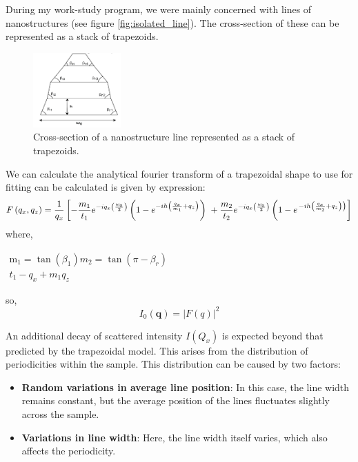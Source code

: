 \medskip

During my work-study program, we were mainly concerned with lines of nanostructures (see figure \ref{fig:isolated_line}). The cross-section of
these can be represented as a stack of trapezoids.
\begin{figure}[h]
    \centering
    \includegraphics[width=0.3\textwidth]{images/trapezoid.png}
    \caption{Cross-section of a nanostructure line represented as a stack of trapezoids.}
    
\end{figure}
We can calculate the analytical fourier transform of a trapezoidal shape to use for fitting
can be calculated is given by expression:
\begin{equation}
    F\left(q_{x}, q_{z}\right)=\frac{1}{q_{x}}\left[-\frac{m_{1}}{t_{1}} e^{-i q_{x}\left(\frac{\omega_{0}}{2}\right)}\left(1-e^{-i h\left(\frac{q_{x}}{m_{1}}+q_{z}\right)}\right)\right. \\ +\frac{m_{2}}{t_{2}} e^{-i q_{x}\left(\frac{\omega_{0}}{2}\right)}\left(1-e^{\left.-i h\left(\frac{q_{x}}{m_{2}}+q_{z}\right)\right)}\right]
\end{equation}
where,

\( \begin{array}{l}\mathrm{m}_{1}=\tan \left(\beta_{1}\right) m_{2}=\tan \left(\pi-\beta_{r}\right) \\ t_{1}-q_{x}+m_{1} q_{z}\end{array} \)

\medskip

so,
\begin{equation}
    I_{0}(\mathbf{q}) = |F(q)|^{2}
\end{equation}

An additional decay of scattered intensity $I(Q_{x})$ is expected beyond that predicted by the trapezoidal model.
This arises from the distribution of periodicities within the sample. This distribution 
can be caused by two factors:
\begin{itemize}
    \item \textbf{Random variations in average line position}: In this case, the line width remains
         constant, but the average position of the lines fluctuates slightly across the 
         sample.
    \item \textbf{Variations in line width}: Here, the line width itself varies, 
        which also affects the periodicity.
\end{itemize}

